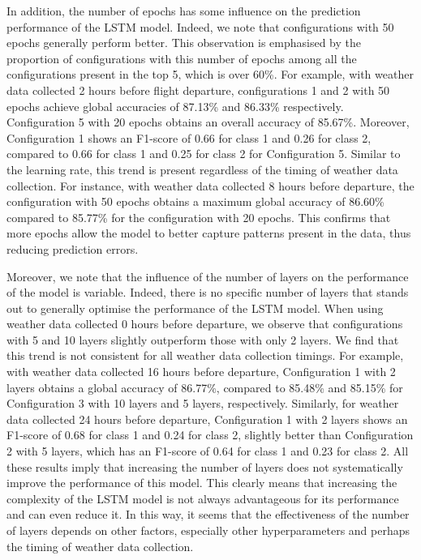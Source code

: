 \documentclass[12pt,oneside]{book} %
\begin{document}
\noindent In addition, the number of epochs has some influence on the prediction performance of the LSTM model. Indeed, we note that configurations with 50 epochs generally perform better. This observation is emphasised by the proportion of configurations with this number of epochs among all the configurations present in the top 5, which is over 60\%. For example, with weather data collected 2 hours before flight departure, configurations 1 and 2 with 50 epochs achieve global accuracies of 87.13\% and 86.33\% respectively. Configuration 5 with 20 epochs obtains an overall accuracy of 85.67\%. Moreover, Configuration 1 shows an F1-score of 0.66 for class 1 and 0.26 for class 2, compared to 0.66 for class 1 and 0.25 for class 2 for Configuration 5. Similar to the learning rate, this trend is present regardless of the timing of weather data collection. For instance, with weather data collected 8 hours before departure, the configuration with 50 epochs obtains a maximum global accuracy of 86.60\% compared to 85.77\% for the configuration with 20 epochs. This confirms that more epochs allow the model to better capture patterns present in the data, thus reducing prediction errors.

\noindent Moreover, we note that the influence of the number of layers on the performance of the model is variable. Indeed, there is no specific number of layers that stands out to generally optimise the performance of the LSTM model. When using weather data collected 0 hours before departure, we observe that configurations with 5 and 10 layers slightly outperform those with only 2 layers. We find that this trend is not consistent for all weather data collection timings. For example, with weather data collected 16 hours before departure, Configuration 1 with 2 layers obtains a global accuracy of 86.77\%, compared to 85.48\% and 85.15\% for Configuration 3 with 10 layers and 5 layers, respectively. Similarly, for weather data collected 24 hours before departure, Configuration 1 with 2 layers shows an F1-score of 0.68 for class 1 and 0.24 for class 2, slightly better than Configuration 2 with 5 layers, which has an F1-score of 0.64 for class 1 and 0.23 for class 2. All these results imply that increasing the number of layers does not systematically improve the performance of this model. This clearly means that increasing the complexity of the LSTM model is not always advantageous for its performance and can even reduce it. In this way, it seems that the effectiveness of the number of layers depends on other factors, especially other hyperparameters and perhaps the timing of weather data collection.
\end{document}
